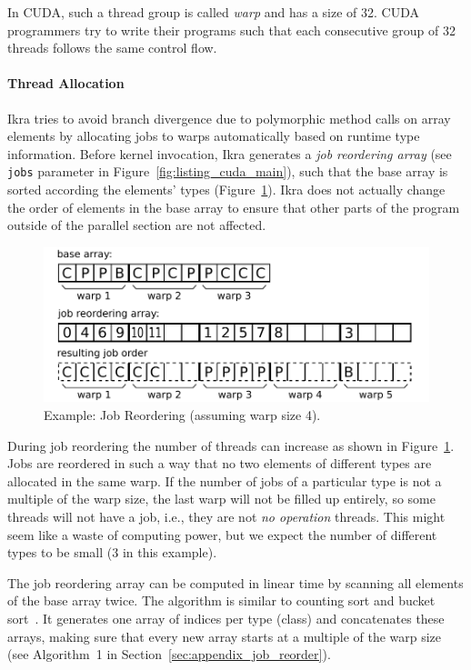 \documentclass[preprint]{sigplanconf}
\begin{document}
In CUDA, such a thread group is called \emph{warp} and has a size of 32. CUDA programmers try to write their programs such that each consecutive group of 32 threads follows the same control flow.

\paragraph{Thread Allocation}
Ikra tries to avoid branch divergence due to polymorphic method calls on array elements by allocating jobs to warps automatically based on runtime type information. Before kernel invocation, Ikra generates a \emph{job reordering array} (see \texttt{jobs} parameter in Figure~\ref{fig:listing_cuda_main}), such that the base array is sorted according the elements' types (Figure~\ref{fig:ex_job_reorder}). Ikra does not actually change the order of elements in the base array to ensure that other parts of the program outside of the parallel section are not affected.

\begin{figure}[!htp]
    \centering
    \includegraphics[width=\columnwidth]{reorder_example.pdf}
    \caption{Example: Job Reordering (assuming warp size 4).}
    \label{fig:ex_job_reorder}
\end{figure}

During job reordering the number of threads can increase as shown in Figure~\ref{fig:ex_job_reorder}. Jobs are reordered in such a way that no two elements of different types are allocated in the same warp. If the number of jobs of a particular type is not a multiple of the warp size, the last warp will not be filled up entirely, so some threads will not have a job, i.e., they are not \emph{no operation} threads. This might seem like a waste of computing power, but we expect the number of different types to be small (3 in this example).

The job reordering array can be computed in linear time by scanning all elements of the base array twice. The algorithm is similar to counting sort and bucket sort~\cite{Corwin:2004:SLT:1040231.1040257}. It generates one array of indices per type (class) and concatenates these arrays, making sure that every new array starts at a multiple of the warp size (see Algorithm~1 in Section~\ref{sec:appendix_job_reorder}).
\end{document}
